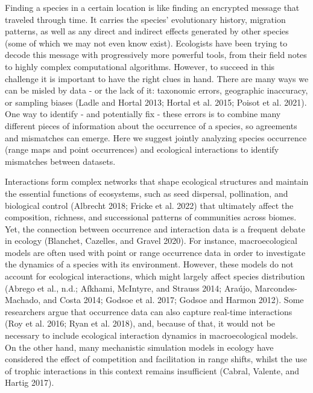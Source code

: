 \documentclass[10pt,oneside]{article}
\begin{document}
Finding a species in a certain location is like finding an encrypted
message that traveled through time. It carries the species' evolutionary
history, migration patterns, as well as any direct and indirect effects
generated by other species (some of which we may not even know exist).
Ecologists have been trying to decode this message with progressively
more powerful tools, from their field notes to highly complex
computational algorithms. However, to succeed in this challenge it is
important to have the right clues in hand. There are many ways we can be
misled by data - or the lack of it: taxonomic errors, geographic
inaccuracy, or sampling biases (Ladle and Hortal 2013; Hortal et al.
2015; Poisot et al. 2021). One way to identify - and potentially fix -
these errors is to combine many different pieces of information about
the occurrence of a species, so agreements and mismatches can emerge.
Here we suggest jointly analyzing species occurrence (range maps and
point occurrences) and ecological interactions to identify mismatches
between datasets.

Interactions form complex networks that shape ecological structures and
maintain the essential functions of ecosystems, such as seed dispersal,
pollination, and biological control (Albrecht 2018; Fricke et al. 2022)
that ultimately affect the composition, richness, and successional
patterns of communities across biomes. Yet, the connection between
occurrence and interaction data is a frequent debate in ecology
(Blanchet, Cazelles, and Gravel 2020). For instance, macroecological
models are often used with point or range occurrence data in order to
investigate the dynamics of a species with its environment. However,
these models do not account for ecological interactions, which might
largely affect species distribution (Abrego et al., n.d.; Afkhami,
McIntyre, and Strauss 2014; Araújo, Marcondes-Machado, and Costa 2014;
Godsoe et al. 2017; Godsoe and Harmon 2012). Some researchers argue that
occurrence data can also capture real-time interactions (Roy et al.
2016; Ryan et al. 2018), and, because of that, it would not be necessary
to include ecological interaction dynamics in macroecological models. On
the other hand, many mechanistic simulation models in ecology have
considered the effect of competition and facilitation in range shifts,
whilst the use of trophic interactions in this context remains
insufficient (Cabral, Valente, and Hartig 2017).
\end{document}
